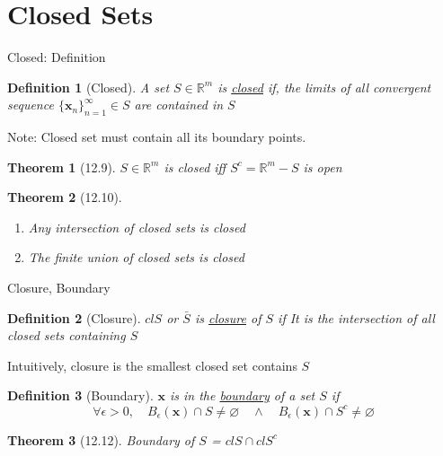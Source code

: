 \documentclass[final]{beamer}
\newtheorem{defn}{Definition}
\newtheorem{thm}{Theorem}
\begin{document}

\section{Closed Sets} %
\label{sec:closed_sets}
\begin{frame}[t]{Closed: Definition}
	\begin{defn}
		[Closed]
		A set $S\in\mathbb{R}^m$ is \uline{closed} if, the limits of all convergent sequence $\{\mathbf{x}_n\}_{n=1}^\infty\in S$ are contained in $S$
	\end{defn}
	Note: Closed set must contain all its boundary points. 
	\begin{thm}
		[12.9] $S\in\mathbb{R}^m$ is closed iff $S^c=\mathbb{R}^m - S$ is open
	\end{thm}
	\begin{thm}
		[12.10]
		\begin{enumerate}
			\item Any intersection of closed sets is closed
			\item The finite union of closed sets is closed
		\end{enumerate}
	\end{thm}
\end{frame}
\begin{frame}[t]{Closure, Boundary}
	\begin{defn}
		[Closure] $cl S$ or $\bar S$ is \uline{closure} of $S$ if It is the intersection of all closed sets containing $S$
	\end{defn}
	Intuitively, closure is the smallest closed set contains $S$
	\begin{defn}
		[Boundary] $\mathbf{x}$ is in the \uline{boundary} of a set $S$ if \[
			\forall \epsilon>0, \quad B_\epsilon(\mathbf{x})\cap S \neq \varnothing \quad\land\quad B_\epsilon(\mathbf{x})\cap S^c \neq \varnothing
		\]
	\end{defn}
	\begin{thm}
		[12.12] Boundary of $S$ = $cl S \cap cl S^c$
	\end{thm}
\end{frame}
\end{document}

